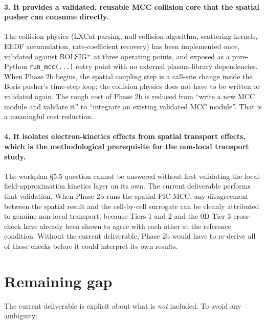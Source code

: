 \documentclass[11pt,a4paper]{article}
\begin{document}
\paragraph{3. It provides a validated, reusable MCC collision core
that the spatial pusher can consume directly.} The collision
physics (LXCat parsing, null-collision algorithm, scattering
kernels, EEDF accumulation, rate-coefficient recovery) has been
implemented once, validated against BOLSIG$^+$ at three operating
points, and exposed as a pure-Python \texttt{run\_mcc(...)} entry
point with no external plasma-library dependencies. When Phase 2b
begins, the spatial coupling step is a call-site change inside the
Boris pusher's time-step loop; the collision physics does not have
to be written or validated again. The rough cost of Phase 2b is
reduced from ``write a new MCC module and validate it'' to
``integrate an existing validated MCC module''. That is a meaningful
cost reduction.

\paragraph{4. It isolates electron-kinetics effects from spatial
transport effects, which is the methodological prerequisite for
the non-local transport study.} The workplan §5.5 question cannot
be answered without first validating the local-field-approximation
kinetics layer on its own. The current deliverable performs that
validation. When Phase 2b runs the spatial PIC-MCC, any
disagreement between the spatial result and the cell-by-cell
surrogate can be cleanly attributed to genuine non-local transport,
because Tiers 1 and 2 and the 0D Tier 3 cross-check have already
been shown to agree with each other at the reference condition.
Without the current deliverable, Phase 2b would have to re-derive
all of those checks before it could interpret its own results.

\section{Remaining gap}
\label{sec:gap}

The current deliverable is explicit about what is \emph{not}
included. To avoid any ambiguity:
\end{document}
